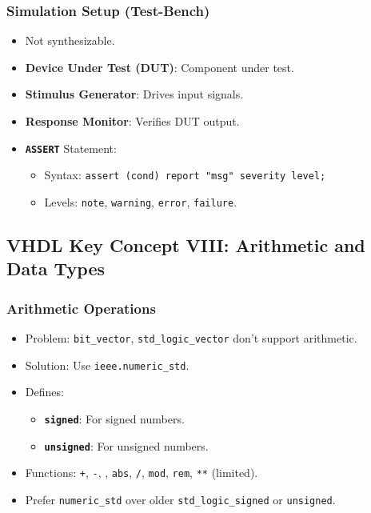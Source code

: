 \subsubsection{Simulation Setup (Test-Bench)}
\begin{itemize}[leftmargin=1.5em]
    \item Not synthesizable.
    \item \textbf{Device Under Test (DUT)}: Component under test.
    \item \textbf{Stimulus Generator}: Drives input signals.
    \item \textbf{Response Monitor}: Verifies DUT output.
    \item \textbf{\texttt{ASSERT}} Statement:
    \begin{itemize}
        \item Syntax: \verb|assert (cond) report "msg" severity level;|
        \item Levels: \texttt{note}, \texttt{warning}, \texttt{error}, \texttt{failure}.
    \end{itemize}
\end{itemize}

\subsection{VHDL Key Concept VIII: Arithmetic and Data Types}

\subsubsection{Arithmetic Operations}
\begin{itemize}[leftmargin=1.5em]
    \item Problem: \texttt{bit\_vector}, \texttt{std\_logic\_vector} don't support arithmetic.
    \item Solution: Use \texttt{ieee.numeric\_std}.
    \item Defines:
    \begin{itemize}
        \item \textbf{\texttt{signed}}: For signed numbers.
        \item \textbf{\texttt{unsigned}}: For unsigned numbers.
    \end{itemize}
    \item Functions: \texttt{+}, \texttt{-}, \texttt{}, \texttt{abs}, \texttt{/}, \texttt{mod}, \texttt{rem}, \texttt{**} (limited).
    \item Prefer \texttt{numeric\_std} over older \texttt{std\_logic\_signed} or \texttt{unsigned}.
\end{itemize}

